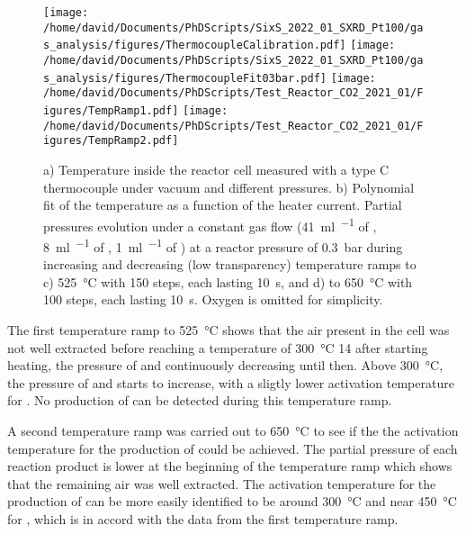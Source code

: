 \begin{figure}[!htb]
    \centering
    \texttt{[image: /home/david/Documents/PhDScripts/SixS\_2022\_01\_SXRD\_Pt100/gas\_analysis/figures/ThermocoupleCalibration.pdf]}
    \texttt{[image: /home/david/Documents/PhDScripts/SixS\_2022\_01\_SXRD\_Pt100/gas\_analysis/figures/ThermocoupleFit03bar.pdf]}
    \texttt{[image: /home/david/Documents/PhDScripts/Test\_Reactor\_CO2\_2021\_01/Figures/TempRamp1.pdf]}
    \texttt{[image: /home/david/Documents/PhDScripts/Test\_Reactor\_CO2\_2021\_01/Figures/TempRamp2.pdf]}
    \caption{
        a) Temperature inside the reactor cell measured with a type C thermocouple under vacuum and different \argon pressures.
        b) Polynomial fit of the temperature as a function of the heater current.
        Partial pressures evolution under a constant gas flow (\qty{41}{\ml\per\min} of \argon, \qty{8}{\ml\per\min} of \dioxygen, \qty{1}{\ml\per\min} of \ammonia) at a reactor pressure of \qty{0.3}{\bar} during increasing and decreasing (low transparency) temperature ramps to c) \qty{525}{\degreeCelsius} with 150 steps, each lasting \qty{10}{\second}, and d) to \qty{650}{\degreeCelsius} with 100 steps, each lasting \qty{10}{\second}.
        Oxygen is omitted for simplicity.
    }
    \label{fig:TempRamps}
\end{figure}

The first temperature ramp to \qty{525}{\degreeCelsius} shows that the air present in the cell was not well extracted before reaching a temperature of \qty{300}{\degreeCelsius} \qty{14}{\min} after starting heating, the pressure of \nitrogen and \water continuously decreasing until then.
Above \qty{300}{\degreeCelsius}, the pressure of \nitrogen and \nitricoxide starts to increase, with a sligtly lower activation temperature for \nitrogen.
No production of \nitrousoxide can be detected during this temperature ramp.

A second temperature ramp was carried out to \qty{650}{\degreeCelsius} to see if the the activation temperature for the production of \nitrousoxide could be achieved.
The partial pressure of each reaction product is lower at the beginning of the temperature ramp which shows that the remaining air was well extracted.
The activation temperature for the production of \nitrogen can be more easily identified to be around \qty{300}{\degreeCelsius} and near \qty{450}{\degreeCelsius} for \nitricoxide, which is in accord with the data from the first temperature ramp.

